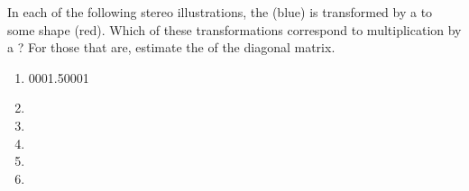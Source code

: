 \begin{exercise} \label{ex:} 
In each of the following stereo illustrations, the  (blue) is transformed by a  to some shape (red).
Which of these transformations correspond to multiplication by a ?  
For those that are, estimate the  of the diagonal matrix.
\begin{enumerate}
\def\unithousesize{small}

\item {}000{1.5}000{1}

\item {}

\item {}

\item {}

\item {}

\item {}

\end{enumerate}
\end{exercise}



